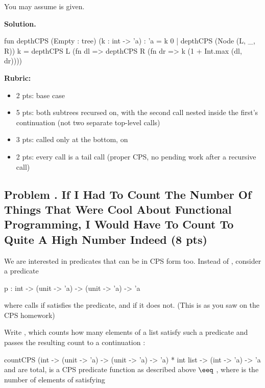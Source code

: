 \documentclass[crop=false]{standalone}
\newif\ifsol
\newenvironment{solution}
    {\par\color{solution_color}\begin{framed}\textbf{Solution.}\par}
    {\end{framed}}
\newcommand{\quizproblem}[3]{%
  \needspace{5\baselineskip}%
  \stepcounter{problem}%
  \ifsol
    \subsection*{Problem \arabic{problem}. #1 \hfill \timing{#2} \quad (#3 pts)}%
  \else
    \subsection*{Problem \arabic{problem}. #1 \hfill (#3 pts)}%
  \fi
}
\newcommand{\answerspace}[1]{\ifsol\else\vspace{#1}\par\fi}
\begin{document}
You may assume  is given.

\answerspace{6cm}

\begin{solution}
\begin{codeblock}
  fun depthCPS (Empty : tree) (k : int -> 'a) : 'a = k 0
    | depthCPS (Node (L, _, R)) k =
        depthCPS L (fn dl =>
          depthCPS R (fn dr =>
            k (1 + Int.max (dl, dr))))
\end{codeblock}

\textbf{Rubric:}
\begin{itemize}
  \item 2 pts: base case 
  \item 5 pts: both subtrees recursed on, with the second call nested
    inside the first's continuation (not two separate top-level calls)
  \item 3 pts:  called only at the bottom, on
  \item 2 pts: every call is a tail call (proper CPS, no pending work after
    a recursive call)
\end{itemize}
\end{solution}

\newpage


\quizproblem{If I Had To Count The Number Of Things That Were Cool About
Functional Programming, I Would Have To Count To Quite A High Number Indeed}{9}{8}

We are interested in predicates that can be in CPS form too. Instead of
, consider a predicate

\begin{codeblock}
  p : int -> (unit -> 'a) -> (unit -> 'a) -> 'a
\end{codeblock}

where  calls  if  satisfies the
predicate, and  if it does not. (This is as you saw on
the CPS homework)

Write , which counts how many elements of a list satisfy
such a predicate and passes the resulting count to a continuation :

\spec
  {countCPS}
  {(int -> (unit -> 'a) -> (unit -> 'a) -> 'a) * int list
   -> (int -> 'a) -> 'a}
  { and  are total,  is a CPS predicate function
  as described above}
  { $\eeq$ , where  is the number
  of elements of  satisfying }
\end{document}
